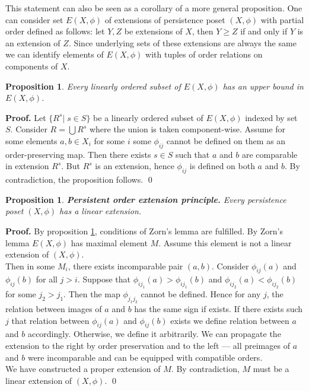 \documentclass[english,12pt]{article}
\newcounter{stmcounter}[section]
\numberwithin{equation}{section}
\newtheorem{proposition}[stmcounter]{Proposition}
\theoremstyle{definition}
\theoremstyle{remark}
\newenvironment{pf}{\noindent\textbf{Proof.}}{\qed}
\renewcommand{\geq}{\geqslant}
\begin{document}
This statement can also be seen as a corollary of a more general proposition.
One can consider set $E(X,\phi)$ of extensions of persistence poset $(X,\phi)$ with partial order defined as follows: let $Y, Z$ be extensions of $X$, then $Y \geq Z$ if and only if $Y$ is an extension of $Z$. Since underlying sets of these extensions are always the same we can identify elements of $E(X,\phi)$ with tuples of order relations on components of $X$.

\begin{proposition}
  \label{Zorn_cond}
  Every linearly ordered subset of $E(X,\phi)$ has an upper bound in $E(X,\phi)$.
\end{proposition}

\begin{pf}
  Let $\{R^s|\;s \in S\}$ be a linearly ordered subset of $E(X,\phi)$ indexed by set $S$. Consider $R = \bigcup R^s$ where the union is taken component-wise. Assume for some elements $a, b \in X_i$ for some $i$ some $\phi_{ij}$ cannot be defined on them as an order-preserving map. Then there exists $s \in S$ such that $a$ and $b$ are comparable in extension $R^s$. But $R^s$ is an extension, hence $\phi_{ij}$ is defined on both $a$ and $b$. By contradiction, the proposition follows.
\end{pf}

\begin{proposition}
  \textbf{Persistent order extension principle.} Every persistence poset $(X,\phi)$ has a linear extension.
\end{proposition}

\begin{pf}
  By proposition \ref{Zorn_cond}, conditions of Zorn's lemma are fulfilled. By Zorn's lemma $E(X,\phi)$ has maximal element $M$. Assume this element is not a linear extension of $(X,\phi)$.\\

  Then in some $M_i$, there exists incomparable pair $(a,b)$. Consider $\phi_{ij}(a)$ and $\phi_{ij}(b)$ for all $j > i$. Suppose that $\phi_{ij_1}(a) > \phi_{ij_1}(b)$ and $\phi_{ij_2}(a) < \phi_{ij_2}(b)$ for some $j_2 > j_1$. Then the map $\phi_{j_1j_2}$ cannot be defined. Hence for any $j$, the relation between images of $a$ and $b$ has the same sign if exists. If there exists such $j$ that relation between $\phi_{ij}(a)$ and $\phi_{ij}(b)$ exists we define relation between $a$ and $b$ accordingly. Otherwise, we define it arbitrarily. We can propagate the extension to the right by order preservation and to the left --- all preimages of $a$ and $b$ were incomparable and can be equipped with compatible orders.\\

  We have constructed a proper extension of $M$. By contradiction, $M$ must be a linear extension of $(X,\phi)$.
\end{pf}
\end{document}
